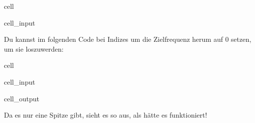 \documentclass[letterpaper,10pt,english]{jupyterBook}
\begin{document}
\begin{sphinxuseclass}{cell}\begin{sphinxVerbatimInput}

\begin{sphinxuseclass}{cell_input}
\begin{sphinxVerbatim}[commandchars=\\\{\}]
      

    
\end{sphinxVerbatim}

\end{sphinxuseclass}\end{sphinxVerbatimInput}

\end{sphinxuseclass}
\sphinxAtStartPar
Du kannst im folgenden Code  bei Indizes um die Zielfrequenz herum auf 0 setzen, um sie loszuwerden:

\begin{sphinxuseclass}{cell}\begin{sphinxVerbatimInput}

\begin{sphinxuseclass}{cell_input}
\begin{sphinxVerbatim}[commandchars=\\\{\}]
\PYG{p}{[}      \PYG{p}{]}  
  
\end{sphinxVerbatim}

\end{sphinxuseclass}\end{sphinxVerbatimInput}
\begin{sphinxVerbatimOutput}

\begin{sphinxuseclass}{cell_output}
\noindent{}

\end{sphinxuseclass}\end{sphinxVerbatimOutput}

\end{sphinxuseclass}
\sphinxAtStartPar
Da es nur eine Spitze gibt, sieht es so aus, als hätte es funktioniert!
\end{document}

